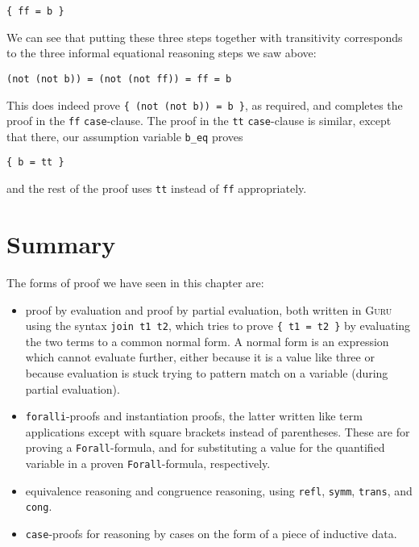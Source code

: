 \documentclass{book}[12pt]
\newcommand{\guru}[0]{\textsc{Guru}\xspace}
\begin{document}
\begin{verbatim}
{ ff = b }
\end{verbatim}

\noindent We can see that putting these three steps together with transitivity
corresponds to the three informal equational reasoning steps we saw above:

\begin{verbatim}
(not (not b)) = (not (not ff)) = ff = b
\end{verbatim}

\noindent This does indeed prove \texttt{\{ (not (not b)) = b \}}, as
required, and completes the proof in the \texttt{ff}
\texttt{case}-clause.  The proof in the \texttt{tt}
\texttt{case}-clause is similar, except that there, our assumption
variable \texttt{b\_eq} proves

\begin{verbatim}
{ b = tt }
\end{verbatim}

\noindent and the rest of the proof uses \texttt{tt} instead of \texttt{ff}
appropriately.

\section{Summary}

The forms of proof we have seen in this chapter are:

\begin{itemize}

\item proof by evaluation and proof by partial evaluation, both
written in \guru using the syntax \texttt{join t1 t2}, which tries to
prove \texttt{\{ t1 = t2 \}} by evaluating the two terms to a common
normal form.  A normal form is an expression which cannot evaluate
further, either because it is a value like three or because evaluation
is stuck trying to pattern match on a variable (during partial
evaluation).

\item \texttt{foralli}-proofs and instantiation proofs, the latter
written like term applications except with square brackets instead
of parentheses.  These are for proving a \texttt{Forall}-formula,
and for substituting a value for the quantified variable in a proven
\texttt{Forall}-formula, respectively.

\item equivalence reasoning and congruence reasoning, using
\texttt{refl}, \texttt{symm}, \texttt{trans}, and \texttt{cong}.

\item \texttt{case}-proofs for reasoning by cases on the form
of a piece of inductive data.

\end{itemize}
\end{document}
